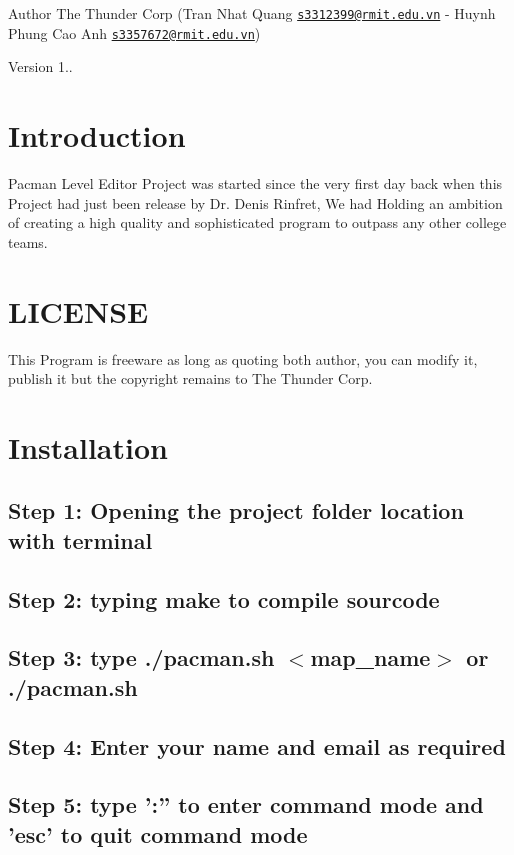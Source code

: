 \begin{DoxyAuthor}{Author}
The Thunder Corp (Tran Nhat Quang \href{mailto:s3312399@rmit.edu.vn}{\tt s3312399@rmit.\-edu.\-vn} -\/ Huynh Phung Cao Anh \href{mailto:s3357672@rmit.edu.vn}{\tt s3357672@rmit.\-edu.\-vn}) 
\end{DoxyAuthor}
\begin{DoxyVersion}{Version}
1..
\end{DoxyVersion}
\hypertarget{index_intro_sec}{}\section{Introduction}\label{index_intro_sec}
Pacman Level Editor Project was started since the very first day back when this Project had just been release by Dr. Denis Rinfret, We had Holding an ambition of creating a high quality and sophisticated program to outpass any other college teams.\hypertarget{index_LICENSE}{}\section{L\-I\-C\-E\-N\-S\-E}\label{index_LICENSE}
This Program is freeware as long as quoting both author, you can modify it, publish it but the copyright remains to The Thunder Corp.\hypertarget{index_install_sec}{}\section{Installation}\label{index_install_sec}
\hypertarget{index_step1}{}\subsection{Step 1\-: Opening the project folder location with terminal}\label{index_step1}
\hypertarget{index_step2}{}\subsection{Step 2\-: typing make to compile sourcode}\label{index_step2}
\hypertarget{index_step3}{}\subsection{Step 3\-: type ./pacman.\-sh $<$map\-\_\-name$>$ or ./pacman.\-sh}\label{index_step3}
\hypertarget{index_step4}{}\subsection{Step 4\-: Enter your name and email as required}\label{index_step4}
\hypertarget{index_step5}{}\subsection{Step 5\-: type '\-:'' to enter command mode and 'esc' to quit command mode}\label{index_step5}
